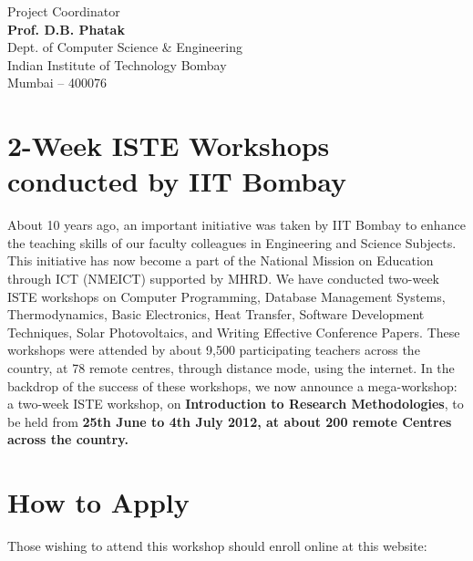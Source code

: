 \documentclass[notuble,10pt,a4paper]{leaflet}
\begin{document}
\begin{center}
\vfill
Project Coordinator\\ 
\textbf{Prof. D.B. Phatak}\\
Dept. of Computer Science \& Engineering\\
Indian Institute of Technology Bombay\\
Mumbai – 400076
\end{center}


\thispagestyle{empty} 
\newpage
\section{{\Large{2-Week ISTE Workshops conducted by IIT Bombay}}}
About 10 years ago, an important initiative was taken by IIT Bombay to enhance the teaching skills of our faculty colleagues in Engineering and Science Subjects. This initiative has now become a part of the National Mission on Education through ICT (NMEICT) supported by MHRD. We have conducted two-week ISTE workshops on Computer Programming, Database Management Systems, Thermodynamics, Basic Electronics, Heat Transfer, Software Development Techniques, Solar Photovoltaics, and Writing Effective Conference Papers. These workshops were attended by about 9,500 participating teachers across the country, at 78 remote centres, through distance mode, using the internet.
In the backdrop of the success of these workshops, we now announce a mega-workshop: a two-week ISTE workshop, on \textbf{Introduction to Research Methodologies}, to be held from \textbf{25th June to 4th July 2012, at about 200 remote Centres across the country.}
\section{{\Large How to Apply}}
Those wishing to attend this workshop should enroll online at this website: 
\end{document}
